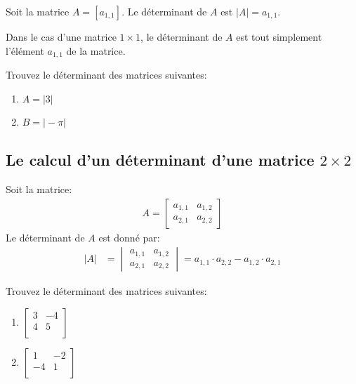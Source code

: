 \documentclass[]{book}
\providecommand{\tightlist}{%
  \setlength{\itemsep}{0pt}\setlength{\parskip}{0pt}}
\theoremstyle{definition}
\theoremstyle{definition}
\theoremstyle{definition}
\theoremstyle{remark}
\let\BeginKnitrBlock\begin \let\EndKnitrBlock\end
\begin{document}
\BeginKnitrBlock{definition}
\protect\hypertarget{def:unnamed-chunk-83}{}{\label{def:unnamed-chunk-83} }Soit la matrice \(A=[a_{1,1}]\). Le déterminant de \(A\) est \(\vert A\vert=a_{1,1}\).
\EndKnitrBlock{definition}

Dans le cas d'une matrice \(1\times 1\), le déterminant de \(A\) est tout simplement l'élément \(a_{1,1}\) de la matrice.

\BeginKnitrBlock{example}
\protect\hypertarget{exm:unnamed-chunk-84}{}{\label{exm:unnamed-chunk-84} }Trouvez le déterminant des matrices suivantes:

\begin{enumerate}
\def\labelenumi{\alph{enumi}.}
\tightlist
\item
  \(A=\vert 3\vert\)
\item
  \(B=\vert -\pi\vert\)
\end{enumerate}
\EndKnitrBlock{example}

\hypertarget{le-calcul-dun-determinant-dune-matrice-2times-2}{%
\subsection{\texorpdfstring{Le calcul d'un déterminant d'une matrice \(2\times 2\)}{Le calcul d'un déterminant d'une matrice 2\textbackslash times 2}}\label{le-calcul-dun-determinant-dune-matrice-2times-2}}

\BeginKnitrBlock{definition}
\protect\hypertarget{def:unnamed-chunk-85}{}{\label{def:unnamed-chunk-85} }Soit la matrice:
\begin{align*}
A = \begin{bmatrix}
a_{1,1} & a_{1,2} \\
a_{2,1} & a_{2,2}
\end{bmatrix}
\end{align*}
Le déterminant de \(A\) est donné par:
\begin{align*}
\vert A\vert &= \begin{vmatrix}
a_{1,1} & a_{1,2} \\
a_{2,1} & a_{2,2}
\end{vmatrix}
=
a_{1,1}\cdot a_{2,2}-a_{1,2}\cdot a_{2,1}
\end{align*}
\EndKnitrBlock{definition}

\BeginKnitrBlock{example}
\protect\hypertarget{exm:unnamed-chunk-86}{}{\label{exm:unnamed-chunk-86} }Trouvez le déterminant des matrices suivantes:

\begin{enumerate}
\def\labelenumi{\alph{enumi}.}
\tightlist
\item
  \(\begin{bmatrix} 3&-4\\ 4&5\\ \end{bmatrix}\)
\item
  \(\begin{bmatrix} 1&-2\\ -4&1\\ \end{bmatrix}\)
\end{enumerate}
\EndKnitrBlock{example}
\end{document}
